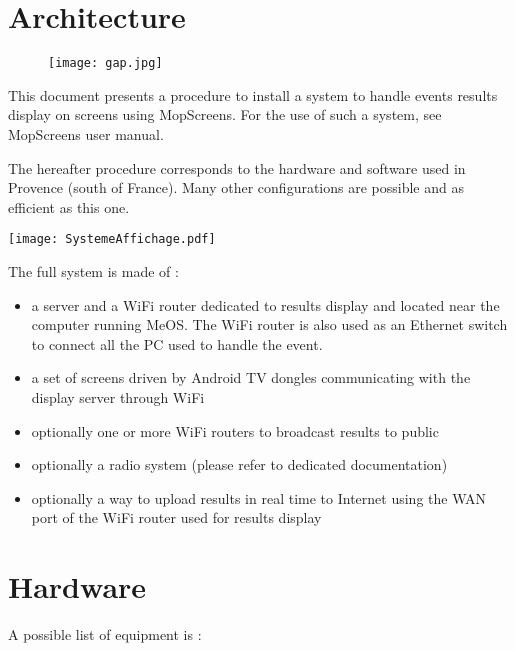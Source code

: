 \documentclass[a4paper]{ffco-rapport}
\begin{document}

	\couverture
	
\chapter{Architecture}
	
\begin{figure}[!ht]
	\centering
		\texttt{[image: gap.jpg]}
	\label{fig:g}
\end{figure}

\vspace{5mm}

This document presents a procedure to install a system to handle events results display on screens using MopScreens.
For the use of such a system, see MopScreens user manual.

The hereafter procedure corresponds to the hardware and software used in Provence (south of France). Many other configurations are possible and as efficient as this one.

\texttt{[image: SystemeAffichage.pdf]}

The full system is made of :
\begin{itemize}
	\item a server and a WiFi router dedicated to results display and located near the computer running MeOS. The WiFi router is also used as an Ethernet switch to connect all the PC used to handle the event.
	\item a set of screens driven by Android TV dongles communicating with the display server through WiFi
	\item optionally one or more WiFi routers to broadcast results to public
	\item optionally a radio system (please refer to dedicated documentation)
	\item optionally a way to upload results in real time to Internet using the WAN port of the WiFi router used for results display
\end{itemize}

\chapter{Hardware}
	A possible list of equipment is :
\end{document}
